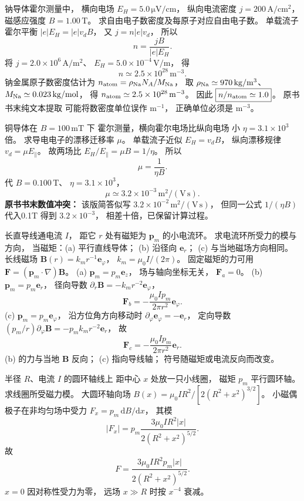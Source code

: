 钠导体霍尔测量中，
横向电场
$E_H=5.0\,\mathrm{\mu V/cm}$，
纵向电流密度
$j=200\,\mathrm{A/cm^2}$，
磁感应强度 $B=1.00\,\mathrm T$。
求自由电子数密度及每原子对应自由电子数。
\exsolution
单载流子霍尔平衡
$|e|E_H=|e|v_dB$，
又 $j=n|e|v_d$，
所以
\[
\boxed{n=\frac{jB}{|e|E_H}}.
\]
将 $j=2.0\times10^6\,
\mathrm{A/m^2}$、
$E_H=5.0\times10^{-4}\,\mathrm{V/m}$，
得
\[
\boxed{n\simeq2.5\times10^{28}\,\mathrm{m^{-3}}}.
\]
钠金属原子数密度估计为
$n_{\rm atom}=\rho_{\rm Na}N_A/M_{\rm Na}$，
取 $\rho_{\rm Na}\simeq970\,\mathrm{kg/m^3}$、
$M_{\rm Na}\simeq0.023\,\mathrm{kg/mol}$，
得
$n_{\rm atom}\simeq2.5\times10^{28}\,\mathrm{m^{-3}}$。
因此
$\boxed{n/n_{\rm atom}\simeq1.0}$。
\excheck 原书书末纯文本提取
可能将数密度单位误作 $\mathrm{m^{-1}}$，
正确单位必须是 $\mathrm{m^{-3}}$。

铜导体在 $B=100\,\mathrm{mT}$ 下
霍尔测量，横向霍尔电场比纵向电场
小 $\eta=3.1\times10^3$ 倍。
求导电电子的漂移迁移率 $\mu$。
\exsolution
单载流子近似
$E_H=v_dB$，
纵向漂移规律
$v_d=\mu E_\parallel$。
故两场比
$E_H/E_\parallel=\mu B=1/\eta$。
所以
\[
\boxed{\mu=\frac1{\eta B}}.
\]
代 $B=0.100\,\mathrm T$、
$\eta=3.1\times10^3$，
\[
\boxed{\mu\simeq3.2\times10^{-3}\,
\mathrm{m^2/(V\,s)}}.
\]
\excheck \textbf{原书书末数值冲突：}
该版简答似写
$3.2\times10^{-2}\,\mathrm{m^2/(V\,s)}$，
但同一公式 $1/(\eta B)$ 代入0.1T
得到 $3.2\times10^{-3}$，
相差十倍，已保留计算过程。

长直导线通电流 $I$，
距它 $r$ 处有磁矩为 $\bm p_m$
的小电流环。
求电流环所受力的模与方向，
当磁矩：(a) 平行直线导体；
(b) 沿径向 $\bm e_r$；
(c) 与当地磁场方向相同。
\exsolution
长线磁场
$\bm B(r)=k_m r^{-1}\bm e_\varphi$，
$k_m=\mu_0I/(2\pi)$。
固定磁矩的力可用
$\bm F=(\bm p_m\cdot\nabla)\bm B$。
(a) $\bm p_m=p_m\bm e_z$，
场与轴向坐标无关，
$\boxed{\bm F_a=0}$。
(b) $\bm p_m=p_m\bm e_r$，
径向导数
$\partial_r\bm B=-k_mr^{-2}\bm e_\varphi$，
\[
\boxed{\bm F_b=
-\frac{\mu_0Ip_m}{2\pi r^2}\bm e_\varphi}.
\]
(c) $\bm p_m=p_m\bm e_\varphi$，
沿方位角方向移动时
$\partial_\varphi\bm e_\varphi=-\bm e_r$，
定向导数
$(p_m/r)\partial_\varphi\bm B
=-p_mk_m r^{-2}\bm e_r$，
故
\[
\boxed{\bm F_c=
-\frac{\mu_0Ip_m}{2\pi r^2}\bm e_r}.
\]
\excheck (b) 的力与当地 $\bm B$ 反向；
(c) 指向导线轴；
符号随磁矩或电流反向而改变。

半径 $R$、电流 $I$ 的圆环轴线上
距中心 $x$ 处放一只小线圈，
磁矩 $p_m$ 平行圆环轴。
求线圈所受磁力模。
\exsolution
大圆环轴向场
$B(x)=\mu_0IR^2/
[2(R^2+x^2)^{3/2}]$。
小磁偶极子在非均匀场中受力
$F_x=p_m\,\mathrm dB/\mathrm dx$，
其模
\[
|F_x|=p_m\frac{3\mu_0IR^2|x|}
{2(R^2+x^2)^{5/2}}.
\]
故
\[
\boxed{F=
\frac{3\mu_0IR^2p_m|x|}
{2(R^2+x^2)^{5/2}}}.
\]
\excheck $x=0$ 因对称性受力为零，
远场 $x\gg R$ 时按 $x^{-4}$ 衰减。

